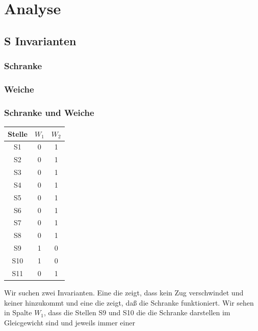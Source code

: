 \documentclass[10pt]{scrartcl}
\begin{document}
\section{Analyse}
	\subsection{S Invarianten}
		\subsubsection{Schranke}
		
		
		\subsubsection{Weiche}
		
		\subsubsection{Schranke und Weiche}
		\begin{tabular}{|c|c|c|}
\hline Stelle  & $W_1$ & $W_2$ \\ 
\hline S1 & 0 & 1 \\ 
\hline S2 & 0 & 1 \\ 
\hline S3 & 0 & 1 \\ 
\hline S4 & 0 & 1 \\ 
\hline S5 & 0 & 1 \\ 
\hline S6 & 0 & 1 \\ 
\hline S7 & 0 & 1 \\ 
\hline S8 & 0 & 1 \\ 
\hline S9 & 1 & 0 \\ 
\hline S10 & 1  & 0 \\ 
\hline S11 & 0 & 1 \\
\hline 
\end{tabular} 
Wir suchen zwei Invarianten. Eine die zeigt, dass kein Zug verschwindet und keiner hinzukommt und eine die zeigt, daß die Schranke funktioniert. Wir sehen in Spalte $W_1$, dass die Stellen S9 und S10 die die Schranke darstellen im Gleicgewicht sind und jeweils immer einer 


		
		
\end{document}
